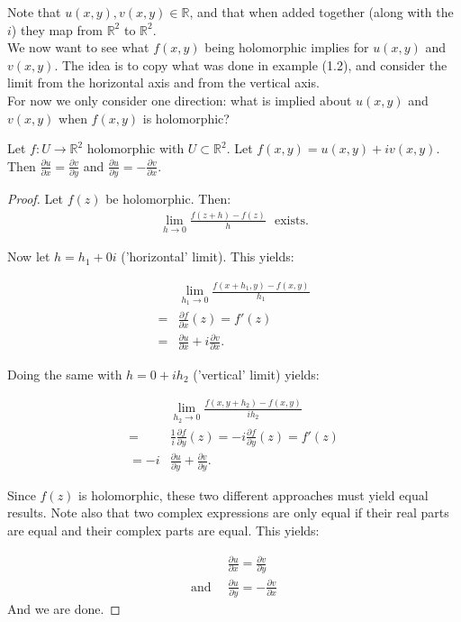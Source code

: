 Note that $u(x,y),v(x,y) \in \mathbb{R}$, and that when added together (along with the $i$) they map from $\mathbb{R}^2$ to $\mathbb{R}^2$.\\

We now want to see what $f(x,y)$ being holomorphic implies for $u(x,y)$ and $v(x,y)$. The idea is to copy what was done in example (1.2), and consider the limit from the horizontal axis and from the vertical axis.\\

For now we only consider one direction: what is implied about $u(x,y)$ and $v(x,y)$ when $f(x,y)$ is holomorphic?\\


\begin{theorem}
Let $f:U \xrightarrow{} \mathbb{R}^2$ holomorphic with $U \subset \mathbb{R}^2$. Let $f(x,y) = u(x,y)+iv(x,y)$. Then $\frac{\partial u}{\partial x} = \frac{\partial v}{\partial y}$ and $\frac{\partial u}{\partial y} = -\frac{\partial v}{\partial x}$.
\end{theorem}

\begin{proof}
Let $f(z)$ be holomorphic. Then:
\begin{align*}
    \lim_{h\xrightarrow{} 0} \frac{f(z+h)-f(z)}{h} \,\, \text{   exists.}
\end{align*}

Now let $h=h_1+0i$ ('horizontal' limit). This yields:

\begin{align*}
    &\lim_{h_1\xrightarrow{} 0} \frac{f(x+h_1,y)-f(x,y)}{h_1}\\
    = &\frac{\partial f}{\partial x}(z) = f'(z)\\
    = &\frac{\partial u}{\partial x} + i \frac{\partial v}{\partial x}.
\end{align*}


Doing the same with $h=0+ih_2$ ('vertical' limit) yields:

\begin{align*}
    &\lim_{h_2\xrightarrow{} 0} \frac{f(x,y+h_2)-f(x,y)}{ih_2}\\
    = &\frac{1}{i}\frac{\partial f}{\partial y}(z) = -i\frac{\partial f}{\partial y}(z) = f'(z)\\
    = -i&\frac{\partial u}{\partial y} +  \frac{\partial v}{\partial y}.
\end{align*}

Since $f(z)$ is holomorphic, these two different approaches must yield equal results. Note also that two complex expressions are only equal if their real parts are equal and their complex parts are equal. This yields:

\begin{align*}
    &\frac{\partial u}{\partial x} = \frac{\partial v}{\partial y}\\
    \text{and } \, & \frac{\partial u}{\partial y} = -\frac{\partial v}{\partial x}
\end{align*}
And we are done.
\end{proof}\\

